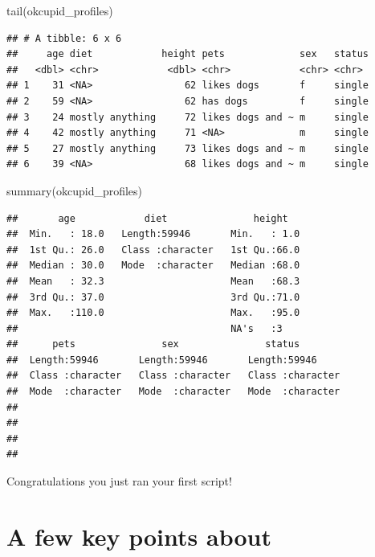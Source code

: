 \documentclass[
]{krantz}
\makeatletter
\newenvironment{Shaded}{\begin{snugshade}}{\end{snugshade}}
\newcommand{\FunctionTok}[1]{\textcolor[rgb]{0,0,0}{#1}}
\newcommand{\NormalTok}[1]{#1}
\newenvironment{kframe}{%
\medskip{}
\setlength{\fboxsep}{.8em}
 \def\at@end@of@kframe{}%
 \ifinner\ifhmode%
  \def\at@end@of@kframe{\end{minipage}}%
  \begin{minipage}{\columnwidth}%
 \fi\fi%
 \def\FrameCommand##1{\hskip\@totalleftmargin \hskip-\fboxsep
 \colorbox{shadecolor}{##1}\hskip-\fboxsep
     \hskip-\linewidth \hskip-\@totalleftmargin \hskip\columnwidth}%
 \MakeFramed {\advance\hsize-\width
   \@totalleftmargin\z@ \linewidth\hsize
   \@setminipage}}%
 {\par\unskip\endMakeFramed%
 \at@end@of@kframe}
\renewenvironment{Shaded}{\begin{kframe}}{\end{kframe}}
\makeatother
\begin{document}
\begin{Shaded}
\begin{Highlighting}[]
\FunctionTok{tail}\NormalTok{(okcupid\_profiles)}
\end{Highlighting}
\end{Shaded}

\begin{verbatim}
## # A tibble: 6 x 6
##     age diet            height pets             sex   status
##   <dbl> <chr>            <dbl> <chr>            <chr> <chr> 
## 1    31 <NA>                62 likes dogs       f     single
## 2    59 <NA>                62 has dogs         f     single
## 3    24 mostly anything     72 likes dogs and ~ m     single
## 4    42 mostly anything     71 <NA>             m     single
## 5    27 mostly anything     73 likes dogs and ~ m     single
## 6    39 <NA>                68 likes dogs and ~ m     single
\end{verbatim}

\begin{Shaded}
\begin{Highlighting}[]
\FunctionTok{summary}\NormalTok{(okcupid\_profiles)}
\end{Highlighting}
\end{Shaded}

\begin{verbatim}
##       age            diet               height    
##  Min.   : 18.0   Length:59946       Min.   : 1.0  
##  1st Qu.: 26.0   Class :character   1st Qu.:66.0  
##  Median : 30.0   Mode  :character   Median :68.0  
##  Mean   : 32.3                      Mean   :68.3  
##  3rd Qu.: 37.0                      3rd Qu.:71.0  
##  Max.   :110.0                      Max.   :95.0  
##                                     NA's   :3     
##      pets               sex               status         
##  Length:59946       Length:59946       Length:59946      
##  Class :character   Class :character   Class :character  
##  Mode  :character   Mode  :character   Mode  :character  
##                                                          
##                                                          
##                                                          
## 
\end{verbatim}

Congratulations you just ran your first script!

\hypertarget{a-few-key-points-about}{%
\section{A few key points about}\label{a-few-key-points-about}}
\end{document}
